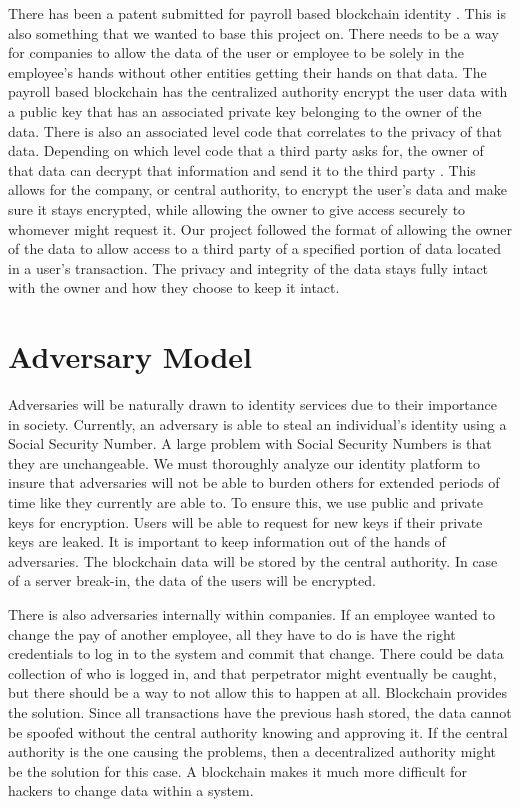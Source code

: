 \documentclass[letterpaper, 10 pt, conference]{ieeeconf}  %
\begin{document}
There has been a patent submitted for payroll based blockchain identity \cite{2}. This is also something that we wanted to base this project on. There needs to be a way for companies to allow the data of the user or employee to be solely in the employee's hands without other entities getting their hands on that data. The payroll based blockchain has the centralized authority encrypt the user data with a public key that has an associated private key belonging to the owner of the data. There is also an associated level code that correlates to the privacy of that data. Depending on which level code that a third party asks for, the owner of that data can decrypt that information and send it to the third party \cite{2}. This allows for the company, or central authority, to encrypt the user's data and make sure it stays encrypted, while allowing the owner to give access securely to whomever might request it. Our project followed the format of allowing the owner of the data to allow access to a third party of a specified portion of data located in a user's transaction. The privacy and integrity of the data stays fully intact with the owner and how they choose to keep it intact.

\section{Adversary Model}

Adversaries will be naturally drawn to identity services due to their importance in society.  Currently, an adversary is able to steal an individual's identity using a Social Security Number.  A large problem with Social Security Numbers is that they are unchangeable.  We must thoroughly analyze our identity platform to insure that adversaries will not be able to burden others for extended periods of time like they currently are able to.  To ensure this, we use public and private keys for encryption.  Users will be able to request for new keys if their private keys are leaked.  It is important to keep information out of the hands of adversaries.  The blockchain data will be stored by the central authority.  In case of a server break-in, the data of the users will be encrypted.

There is also adversaries internally within companies. If an employee wanted to change the pay of another employee, all they have to do is have the right credentials to log in to the system and commit that change. There could be data collection of who is logged in, and that perpetrator might eventually be caught, but there should be a way to not allow this to happen at all. Blockchain provides the solution. Since all transactions have the previous hash stored, the data cannot be spoofed without the central authority knowing and approving it. If the central authority is the one causing the problems, then a decentralized authority might be the solution for this case. A blockchain makes it much more difficult for hackers to change data within a system.   
\end{document}
